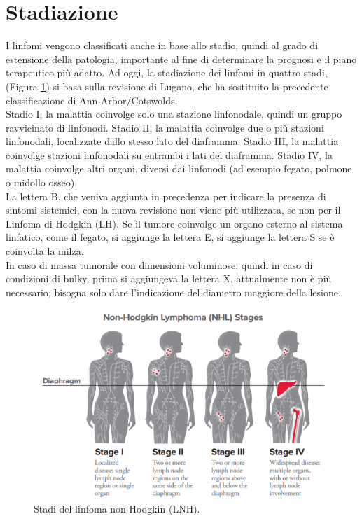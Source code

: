 \section{Stadiazione}
I linfomi vengono classificati anche in base allo stadio, quindi al grado di estensione della patologia, 
importante al fine di determinare la prognosi e il piano terapeutico più adatto. 
Ad oggi, la stadiazione dei linfomi in quattro stadi, (Figura \ref{fig:FIGURE_2.14}) si basa sulla revisione di 
Lugano, che ha sostituito la precedente classificazione di Ann-Arbor/Cotswolds\cite{AIOM}.\\
Stadio I, la malattia coinvolge solo una stazione linfonodale, quindi un gruppo ravvicinato di linfonodi. 
Stadio II, la malattia coinvolge due o più stazioni linfonodali, localizzate dallo stesso lato del diaframma. 
Stadio III, la malattia coinvolge stazioni linfonodali su entrambi i lati del diaframma. 
Stadio IV, la malattia coinvolge altri organi, diversi dai linfonodi (ad esempio fegato, polmone o midollo osseo)\cite{LLS}.\\
La lettera B, che veniva aggiunta in precedenza per indicare la presenza di sintomi sistemici, 
con la nuova revisione non viene più utilizzata, se non per il Linfoma di Hodgkin (LH)\cite{AIOM}.
Se il tumore coinvolge un organo esterno al sistema linfatico, come il fegato, si aggiunge la lettera E, 
si aggiunge la lettera S se è coinvolta la milza\cite{ISTGENT}.\\
In caso di massa tumorale con dimensioni voluminose, quindi in caso di condizioni di bulky, 
prima si aggiungeva la lettera X, attualmente non è più necessario, 
bisogna solo dare l’indicazione del diametro maggiore della lesione\cite{AIOM}.\\ 

\begin{figure}[H]
    \begin{center}
    \includegraphics[width=0.7\columnwidth]{img/nhlstages.png}
    \vspace{-3mm}
    \end{center}
    \caption{Stadi del linfoma non-Hodgkin (LNH).
    \cite{LLS}}
    \label{fig:FIGURE_2.14}
\end{figure}

